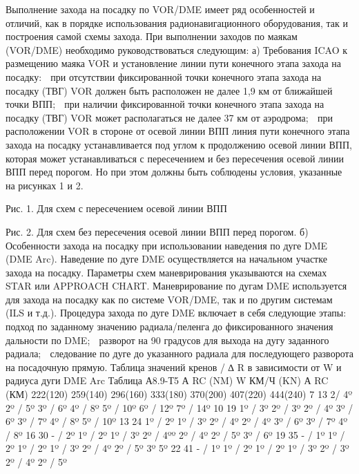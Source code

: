Выполнение захода на посадку по VOR/DME имеет ряд особенностей и отличий, как в порядке использования радионавигационного оборудования, так и построения самой схемы захода.
При выполнении заходов по маякам (VOR/DME) необходимо руководствоваться следующим:
а)	Требования ICAO к размещению маяка VOR и установление линии пути конечного этапа захода на посадку:
	при отсутствии фиксированной точки конечного этапа захода на посадку (ТВГ) VOR должен быть расположен не далее 1,9 км от ближайшей точки ВПП;
	при наличии фиксированной точки конечного этапа захода на посадку (ТВГ) VOR может располагаться не далее 37 км от аэродрома;
	при расположении VOR в стороне от осевой линии ВПП линия пути конечного этапа захода на посадку устанавливается под углом к продолжению осевой линии ВПП, которая может устанавливаться с пересечением и без пересечения осевой линии ВПП перед порогом. Но при этом должны быть соблюдены условия, указанные на рисунках 1 и 2.





 
Рис. 1. Для схем с пересечением осевой линии ВПП
 
Рис. 2. Для схем без пересечения осевой линии ВПП перед порогом.
б)	Особенности захода на посадку при использовании наведения по дуге DME (DME Arc).
Наведение по дуге DME осуществляется на начальном участке захода на посадку. Параметры схем маневрирования указываются на схемах STAR или APPROACH CHART. Маневрирование по дугам DME используется для захода на посадку как по системе VOR/DME, так и по другим системам (ILS и т.д.).
Процедура захода по дуге DME включает в себя следующие этапы:
	подход по заданному значению радиала/пеленга до фиксированного значения дальности по DME;
	разворот на 90 градусов для выхода на дугу заданного радиала;
	следование по дуге до указанного радиала для последующего разворота на посадочную прямую.
Таблица значений кренов / ∆ R в зависимости от W и радиуса дуги DME Arc
                                                                                                                                                 Таблица А8.9-Т5
А RC (NM)	W КМ/Ч (KN)
А RC (КМ)	222(120)	259(140)	296(160)	333(180)	370(200)	407(220)	444(240)
7	13	2/ 4º	2º / 5º	3º / 6º	4º / 8º	5º / 10º	6º / 12º	7º / 14º
10	19	1º / 3º	2º / 3º	2º / 4º	3º / 6º	3º / 7º	4º / 8º	5º / 10º
13	24	1º / 2º	1º / 3º	2º / 4º	2º / 4º	3º / 6º	3º / 7º	4º / 8º
16	30	- / 2º	1º / 2º	1º / 3º	2º / 4ºº	2º / 4º	2º / 5º	3º / 6º
19	35	- / 1º	1º / 2º	1º / 2º	1º / 3º	2º / 4º	2º / 5º	3º 5º
22	41	- / 1º	1º / 2º	1º / 2º	1º / 3º	2º / 3º	2º / 4º	2º / 5º

